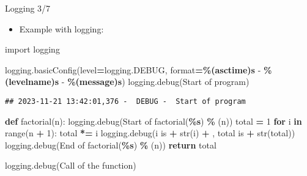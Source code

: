 \documentclass[
  8pt,
  ignorenonframetext,
]{beamer}
\newenvironment{Shaded}{\begin{snugshade}}{\end{snugshade}}
\newcommand{\BuiltInTok}[1]{#1}
\newcommand{\ControlFlowTok}[1]{\textcolor[rgb]{0.13,0.29,0.53}{\textbf{#1}}}
\newcommand{\DecValTok}[1]{\textcolor[rgb]{0.00,0.00,0.81}{#1}}
\newcommand{\ImportTok}[1]{#1}
\newcommand{\KeywordTok}[1]{\textcolor[rgb]{0.13,0.29,0.53}{\textbf{#1}}}
\newcommand{\NormalTok}[1]{#1}
\newcommand{\OperatorTok}[1]{\textcolor[rgb]{0.81,0.36,0.00}{\textbf{#1}}}
\newcommand{\SpecialCharTok}[1]{\textcolor[rgb]{0.81,0.36,0.00}{\textbf{#1}}}
\newcommand{\StringTok}[1]{\textcolor[rgb]{0.31,0.60,0.02}{#1}}
\providecommand{\tightlist}{%
  \setlength{\itemsep}{0pt}\setlength{\parskip}{0pt}}
\begin{document}
\begin{frame}[fragile]{Logging 3/7}
\protect\hypertarget{logging-37}{}
\begin{itemize}
\tightlist
\item
  Example with logging:
\end{itemize}

\begin{Shaded}
\begin{Highlighting}[]
\ImportTok{import}\NormalTok{ logging}

\NormalTok{logging.basicConfig(level}\OperatorTok{=}\NormalTok{logging.DEBUG, }\BuiltInTok{format}\OperatorTok{=}\StringTok{\textquotesingle{}}\SpecialCharTok{\%(asctime)s}\StringTok{ {-}  }\SpecialCharTok{\%(levelname)s}\StringTok{ {-}  }\SpecialCharTok{\%(message)s}\StringTok{\textquotesingle{}}\NormalTok{)}
\NormalTok{logging.debug(}\StringTok{\textquotesingle{}Start of program\textquotesingle{}}\NormalTok{)}
\end{Highlighting}
\end{Shaded}

\begin{verbatim}
## 2023-11-21 13:42:01,376 -  DEBUG -  Start of program
\end{verbatim}

\begin{Shaded}
\begin{Highlighting}[]
\KeywordTok{def}\NormalTok{ factorial(n):}
\NormalTok{    logging.debug(}\StringTok{\textquotesingle{}Start of factorial(}\SpecialCharTok{\%s}\StringTok{)\textquotesingle{}}  \OperatorTok{\%}\NormalTok{ (n))}
\NormalTok{    total }\OperatorTok{=} \DecValTok{1}
    \ControlFlowTok{for}\NormalTok{ i }\KeywordTok{in} \BuiltInTok{range}\NormalTok{(n }\OperatorTok{+} \DecValTok{1}\NormalTok{):}
\NormalTok{        total }\OperatorTok{*=}\NormalTok{ i}
\NormalTok{        logging.debug(}\StringTok{\textquotesingle{}i is \textquotesingle{}} \OperatorTok{+} \BuiltInTok{str}\NormalTok{(i) }\OperatorTok{+} \StringTok{\textquotesingle{}, total is \textquotesingle{}} \OperatorTok{+} \BuiltInTok{str}\NormalTok{(total))}
\NormalTok{    logging.debug(}\StringTok{\textquotesingle{}End of factorial(}\SpecialCharTok{\%s}\StringTok{)\textquotesingle{}}  \OperatorTok{\%}\NormalTok{ (n))}
    \ControlFlowTok{return}\NormalTok{ total}

\NormalTok{logging.debug(}\StringTok{\textquotesingle{}Call of the function\textquotesingle{}}\NormalTok{)}
\end{Highlighting}
\end{Shaded}


\end{frame}
\end{document}
